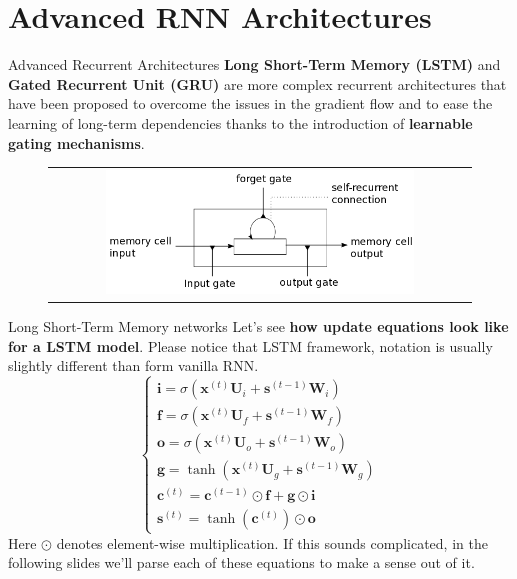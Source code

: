 \documentclass[aspectratio=169]{beamer}
\begin{document}
\section{Advanced RNN Architectures}

\begin{frame}{Advanced Recurrent Architectures}
\textbf{Long Short-Term Memory (LSTM)} and \textbf{Gated Recurrent Unit (GRU)} are more complex recurrent architectures that have been proposed \cite{hochreiter1997long,cho2014learning} to overcome the issues in the gradient flow and to ease the learning of long-term dependencies thanks to the introduction of \textbf{learnable gating mechanisms}.
	\begin{figure}
	\begin{tabular}{c}
	\includegraphics[width=0.75\textwidth]{img/rnn/lstm_cell.png}
	\end{tabular}
	\end{figure}
\end{frame}


\begin{frame}{Long Short-Term Memory networks}
Let's see \textbf{how update equations look like for a LSTM model}. Please notice that LSTM framework, notation is usually slightly different than form vanilla RNN. 
\begin{equation}
	\begin{cases}
	\bm{i} = \sigma(\bm{x}^{(t)}\bm{U}_{i} + \bm{s}^{(t-1)}\bm{W}_{i})\\
	\bm{f} = \sigma(\bm{x}^{(t)}\bm{U}_{f} + \bm{s}^{(t-1)}\bm{W}_{f})\\
	\bm{o} = \sigma(\bm{x}^{(t)}\bm{U}_{o} + \bm{s}^{(t-1)}\bm{W}_{o})\\
	\bm{g} = \tanh(\bm{x}^{(t)}\bm{U}_g + \bm{s}^{(t-1)}\bm{W}_g)\\
	\bm{c}^{(t)} = \bm{c}^{(t-1)} \odot \bm{f} + \bm{g} \odot \bm{i}\\
	\bm{s}^{(t)} = \tanh(\bm{c}^{(t)}) \odot \bm{o}
	\end{cases}
\end{equation}
Here $\odot$ denotes element-wise multiplication. If this sounds complicated, in the following slides we'll parse each of these equations to make a sense out of it.
\end{frame}
\end{document}
